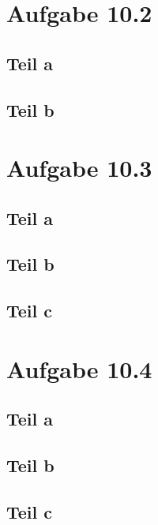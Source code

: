 \documentclass[10pt,a4paper]{article}
\begin{document}
\section{Aufgabe 10.2}

\subsection{Teil a}

\subsection{Teil b}

\section{Aufgabe 10.3}

\subsection{Teil a}

\subsection{Teil b}

\subsection{Teil c}

\section{Aufgabe 10.4}

\subsection{Teil a}

\subsection{Teil b}

\subsection{Teil c}
\end{document}

